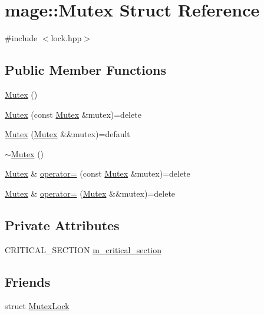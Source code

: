 \hypertarget{structmage_1_1_mutex}{}\section{mage\+:\+:Mutex Struct Reference}
\label{structmage_1_1_mutex}


{\ttfamily \#include $<$lock.\+hpp$>$}

\subsection*{Public Member Functions}
\begin{DoxyCompactItemize}
\item 
\hyperlink{structmage_1_1_mutex_ab22db01311271ef54642b10ea53dfd8a}{Mutex} ()
\item 
\hyperlink{structmage_1_1_mutex_af1c2c7d0134ba853903522d2f3684f22}{Mutex} (const \hyperlink{structmage_1_1_mutex}{Mutex} \&mutex)=delete
\item 
\hyperlink{structmage_1_1_mutex_ae6810872c542877f10ea09283e57b6d1}{Mutex} (\hyperlink{structmage_1_1_mutex}{Mutex} \&\&mutex)=default
\item 
\hyperlink{structmage_1_1_mutex_a143d82ec7bb43f953a1703caa7972e9d}{$\sim$\+Mutex} ()
\item 
\hyperlink{structmage_1_1_mutex}{Mutex} \& \hyperlink{structmage_1_1_mutex_a56072bdabdeadd5d897de232dbd298a0}{operator=} (const \hyperlink{structmage_1_1_mutex}{Mutex} \&mutex)=delete
\item 
\hyperlink{structmage_1_1_mutex}{Mutex} \& \hyperlink{structmage_1_1_mutex_aaef0078f5b70afb0e5a290a5b5f33680}{operator=} (\hyperlink{structmage_1_1_mutex}{Mutex} \&\&mutex)=delete
\end{DoxyCompactItemize}
\subsection*{Private Attributes}
\begin{DoxyCompactItemize}
\item 
C\+R\+I\+T\+I\+C\+A\+L\+\_\+\+S\+E\+C\+T\+I\+ON \hyperlink{structmage_1_1_mutex_a18414337aef28b7ed261e7a805d2c103}{m\+\_\+critical\+\_\+section}
\end{DoxyCompactItemize}
\subsection*{Friends}
\begin{DoxyCompactItemize}
\item 
struct \hyperlink{structmage_1_1_mutex_a058473d070063e5098732f355f432bd9}{Mutex\+Lock}
\end{DoxyCompactItemize}


